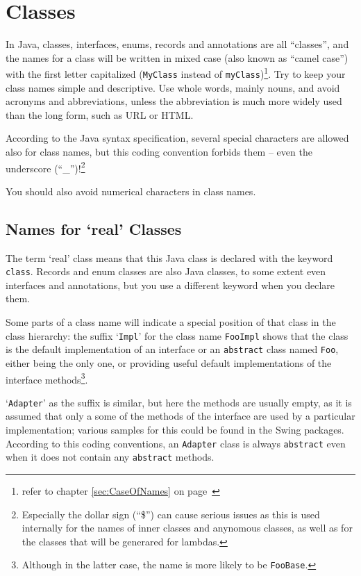 \documentclass[11pt,a4paper, titlepage, parskip=half, headsepline, footsepline, cleardoublepage=current, headheight=1cm]{scrbook}
\newcommand*{\tqvref}[1]{\hyperref[{#1}]{\ref*{#1}} on page~\pageref{#1}}
\begin{document}

\section{Classes}\label{sec:Classes}
In Java, classes, interfaces, enums, records and annotations are all “classes”, and the names for a class will be written in mixed case (also known as “camel case”) with the first letter capitalized (\lstinline|MyClass| instead of \lstinline|myClass|)\footnote{refer to chapter \tqvref{sec:CaseOfNames}}. Try to keep your class names simple and descriptive. Use whole words, mainly nouns, and avoid acronyms and abbreviations, unless the abbreviation is much more widely used than the long form, such as URL or HTML.

According to the Java syntax specification, several special characters are allowed also for class names, but this coding convention forbids them – even the underscore (“\_”)!\footnote{Especially the dollar sign (“\$”) can cause serious issues as this is used internally for the names of inner classes and anynomous classes, as well as for the classes that will be generared for lambdas.}

You should also avoid numerical characters in class names.


\subsection{Names for ‘real’ Classes}\label{sec:NamesForClasses}
The term ‘real’ class means that this Java class is declared with the keyword \lstinline|class|. Records and enum classes are also Java classes, to some extent even interfaces and annotations, but you use a different keyword when you declare them.

Some parts of a class name will indicate a special position of that class in the class hierarchy: the suffix ‘\verb#Impl#’ for the class name \lstinline|FooImpl| shows that the class is the default implementation of an interface or an \lstinline|abstract| class named \lstinline|Foo|, either being the only one, or providing useful default implementations of the interface methods\footnote{Although in the latter case, the name is more likely to be \lstinline|FooBase|.}.

‘\verb#Adapter#’ as the suffix is similar, but here the methods are usually empty, as it is assumed that only a some of the methods of the interface are used by a particular implementation; various samples for this could be found in the Swing packages. According to this coding conventions, an \lstinline|Adapter| class is always \lstinline|abstract| even when it does not contain any \lstinline|abstract| methods.
\end{document}
